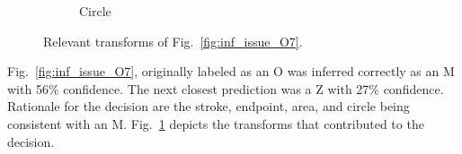 \documentclass[conference]{IEEEtran}
\begin{document}
\begin{figure}[h]
\begin{subfigure}{.20\columnwidth}
        \caption{Circle}
    \end{subfigure}%
    \caption{Relevant transforms of Fig.~\ref{fig:inf_issue_O7}.}
    \label{fig:o7_trans}
\end{figure}

Fig.~\ref{fig:inf_issue_O7}, originally labeled as an O was inferred correctly
as an M with 56\% confidence. The next closest prediction was a Z with 27\%
confidence.  Rationale for the decision are the stroke, endpoint, area,
and circle being consistent with an M. Fig.~\ref{fig:o7_trans} depicts the
transforms that contributed to the decision.
\end{document}
